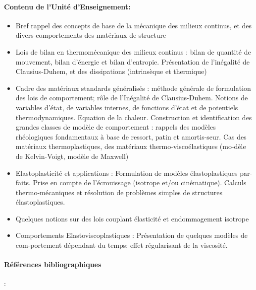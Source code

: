 \paragraph{Contenu de l’Unité d’Enseignement:}
\begin{itemize}
\item	Bref rappel des concepts de base de la mécanique des milieux continus, et des divers comportements des matériaux de structure
\item	Lois de bilan en thermomécanique des milieux continus : bilan de quantité de mouvement, bilan d’énergie et bilan d’entropie. Présentation de l’inégalité de Clausius-Duhem, et des dissipations (intrinsèque et thermique)
\item	Cadre des matériaux standards généralisés : méthode générale de formulation des lois de comportement; rôle de l’Inégalité de Clausius-Duhem. Notions de variables d’état, de variables internes, de fonctions d’état et de potentiels thermodynamiques. Equation de la chaleur.
Construction et identification des grandes classes de modèle de comportement : rappels des modèles rhéologiques fondamentaux à base de ressort, patin et amortis-seur. Cas des matériaux thermoplastiques, des matériaux thermo-viscoélastiques (mo-dèle de Kelvin-Voigt, modèle de Maxwell)
\item	Elastoplasticité et applications : Formulation de modèles élastoplastiques par-faits. Prise en compte de l’écrouissage (isotrope et/ou cinématique). Calculs thermo-mécaniques et résolution de problèmes simples de structures élastoplastiques.
\item	Quelques notions sur des lois couplant élasticité et endommagement isotrope
\item	Comportements Elastoviscoplastiques : Présentation de quelques modèles de com-portement dépendant du temps; effet régularisant de la viscosité. 
\end{itemize}



\paragraph{Références bibliographiques}:

